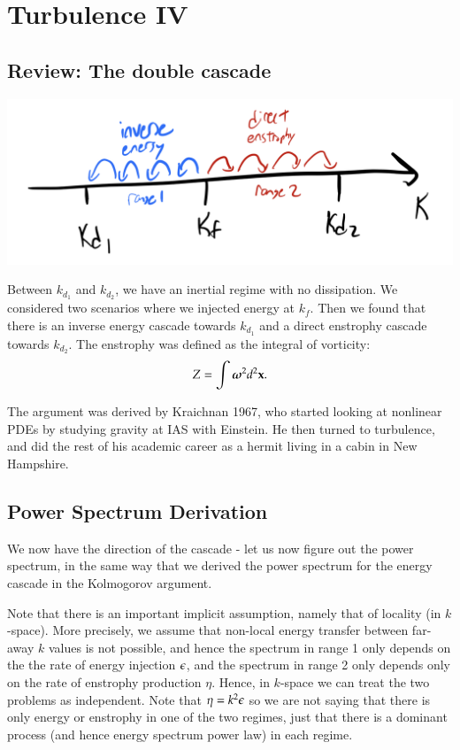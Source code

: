 \section{Turbulence IV}

\subsection{Review: The double cascade}

\begin{center}
    \includegraphics[scale=0.4]{Lectures/Images/lec15-dualcascade.png}
\end{center}

Between $k_{d_1}$ and $k_{d_2}$, we have an inertial regime with no dissipation. We considered two scenarios where we injected energy at $k_f$. Then we found that there is an inverse energy cascade towards $k_{d_1}$ and a direct enstrophy cascade towards $k_{d_2}$. The enstrophy was defined as the integral of vorticity:
\begin{equation}
    Z = \int \mbox{\boldmath$ \omega $}^2 d^2\mathbf{x}.
\end{equation}

The argument was derived by Kraichnan 1967, who started looking at nonlinear PDEs by studying gravity at IAS with Einstein. He then turned to turbulence, and did the rest of his academic career as a hermit living in a cabin in New Hampshire.

\subsection{Power Spectrum Derivation}
We now have the direction of the cascade - let us now figure out the power spectrum, in the same way that we derived the power spectrum for the energy cascade in the Kolmogorov argument.

Note that there is an important implicit assumption, namely that of locality (in $k$-space). More precisely, we assume that non-local energy transfer between far-away $k$ values is not possible, and hence the spectrum in range 1 only depends on the the rate of energy injection $\epsilon$, and the spectrum in range 2 only depends only on the rate of enstrophy production $\eta$. Hence, in $k$-space we can treat the two problems as independent. Note that $\eta = k^2\epsilon$ so we are not saying that there is only energy or enstrophy in one of the two regimes, just that there is a dominant process (and hence energy spectrum power law) in each regime.

